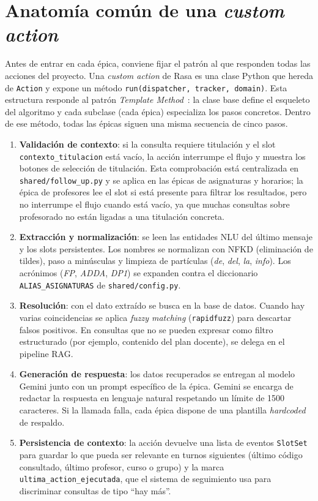 \section{Anatomía común de una \textit{custom action}}\label{sec:impl-anatomia}

Antes de entrar en cada épica, conviene fijar el patrón al que responden todas las acciones del proyecto. Una \textit{custom action} de Rasa es una clase Python que hereda de \texttt{Action} y expone un método \texttt{run(dispatcher, tracker, domain)}. Esta estructura responde al patrón \textit{Template Method}~\cite{gamma1994gof}: la clase base define el esqueleto del algoritmo y cada subclase (cada épica) especializa los pasos concretos. Dentro de ese método, todas las épicas siguen una misma secuencia de cinco pasos.

\begin{enumerate}
    \item \textbf{Validación de contexto}: si la consulta requiere titulación y el slot \texttt{contexto\_titulacion} está vacío, la acción interrumpe el flujo y muestra los botones de selección de titulación. Esta comprobación está centralizada en \texttt{shared/follow\_up.py} y se aplica en las épicas de asignaturas y horarios; la épica de profesores lee el slot si está presente para filtrar los resultados, pero no interrumpe el flujo cuando está vacío, ya que muchas consultas sobre profesorado no están ligadas a una titulación concreta.
    \item \textbf{Extracción y normalización}: se leen las entidades NLU del último mensaje y los slots persistentes. Los nombres se normalizan con NFKD (eliminación de tildes), paso a minúsculas y limpieza de partículas (\textit{de}, \textit{del}, \textit{la}, \textit{info}). Los acrónimos (\textit{FP}, \textit{ADDA}, \textit{DP1}) se expanden contra el diccionario \texttt{ALIAS\_ASIGNATURAS} de \texttt{shared/config.py}.
    \item \textbf{Resolución}: con el dato extraído se busca en la base de datos. Cuando hay varias coincidencias se aplica \textit{fuzzy matching} (\texttt{rapidfuzz}) para descartar falsos positivos. En consultas que no se pueden expresar como filtro estructurado (por ejemplo, contenido del plan docente), se delega en el pipeline RAG.
    \item \textbf{Generación de respuesta}: los datos recuperados se entregan al modelo Gemini junto con un prompt específico de la épica. Gemini se encarga de redactar la respuesta en lenguaje natural respetando un límite de 1500 caracteres. Si la llamada falla, cada épica dispone de una plantilla \textit{hardcoded} de respaldo.
    \item \textbf{Persistencia de contexto}: la acción devuelve una lista de eventos \texttt{SlotSet} para guardar lo que pueda ser relevante en turnos siguientes (último código consultado, último profesor, curso o grupo) y la marca \texttt{ultima\_action\_ejecutada}, que el sistema de seguimiento usa para discriminar consultas de tipo ``hay más''.
\end{enumerate}

